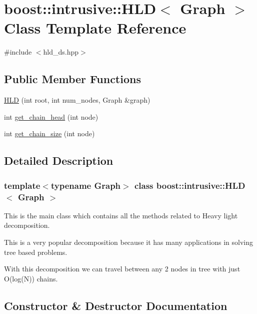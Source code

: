 \hypertarget{classboost_1_1intrusive_1_1HLD}{}\section{boost\+:\+:intrusive\+:\+:H\+LD$<$ Graph $>$ Class Template Reference}
\label{classboost_1_1intrusive_1_1HLD}


{\ttfamily \#include $<$hld\+\_\+ds.\+hpp$>$}

\subsection*{Public Member Functions}
\begin{DoxyCompactItemize}
\item 
\hyperlink{classboost_1_1intrusive_1_1HLD_a57f95a8d4653ba18178223b24a8b1fcd}{H\+LD} (int root, int num\+\_\+nodes, Graph \&graph)
\item 
int \hyperlink{classboost_1_1intrusive_1_1HLD_af7431ec20f7c788119f1136916e7c4a8}{get\+\_\+chain\+\_\+head} (int node)
\item 
int \hyperlink{classboost_1_1intrusive_1_1HLD_a52a0f91efab2e5fcee4e715dffb114cf}{get\+\_\+chain\+\_\+size} (int node)
\end{DoxyCompactItemize}


\subsection{Detailed Description}
\subsubsection*{template$<$typename Graph$>$\newline
class boost\+::intrusive\+::\+H\+L\+D$<$ Graph $>$}


\begin{DoxyItemize}
\item This is the main class which contains all the methods related to Heavy light decomposition. 
\item This is a very popular decomposition because it has many applications in solving tree based problems. 
\item With this decomposition we can travel between any 2 nodes in tree with just O(log(\+N)) chains. 
\end{DoxyItemize}

\subsection{Constructor \& Destructor Documentation}
\mbox{\label{classboost_1_1intrusive_1_1HLD_a57f95a8d4653ba18178223b24a8b1fcd}} 
